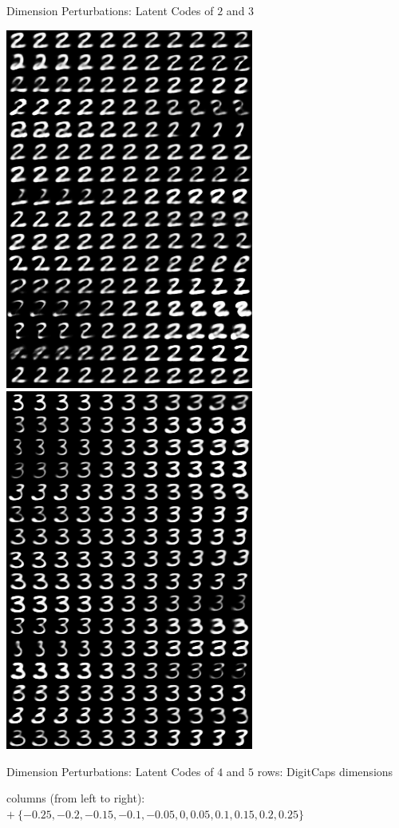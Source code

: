 \documentclass{beamer}
\begin{document}
{\begin{frame}{Dimension Perturbations: Latent Codes of $2$ and $3$}
      \begin{center}
        \includegraphics[width=.4\textwidth]{../img/recons-capsnet-keras/manipulate-2.png}
        \includegraphics[width=.4\textwidth]{../img/recons-capsnet-keras/manipulate-3.png}
      \end{center}
    \end{frame}

    \begin{frame}{Dimension Perturbations: Latent Codes of $4$ and $5$}
      \tiny
      rows: DigitCaps dimensions

      columns (from left to right): $+ \  \{ -0.25, -0.2, -0.15, -0.1, -0.05, 0, 0.05, 0.1, 0.15, 0.2, 0.25 \}$


\end{frame}}
\end{document}
